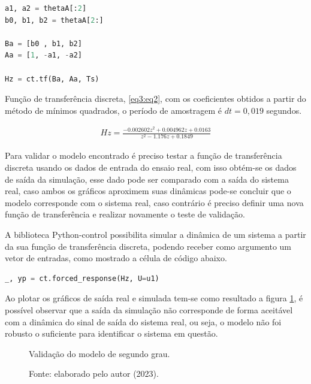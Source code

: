 \vspace{0.5cm}

\begin{lstlisting}[language=python]
a1, a2 = thetaA[:2]
b0, b1, b2 = thetaA[2:]

Ba = [b0 , b1, b2]
Aa = [1, -a1, -a2]

Hz = ct.tf(Ba, Aa, Ts)
\end{lstlisting}

Função de transferência discreta, \ref{eq3:eq2}, com os coeficientes obtidos a partir do método de mínimos quadrados, o período de amostragem é $dt = 0,019$  segundos.

\begin{align}
Hz = \frac{-0.002602 z^2 + 0.004962 z + 0.0163}{z^2 - 1.176 z + 0.1849} \label{eq3:eq2}
\end{align}


Para validar o modelo encontrado é preciso testar a função de transferência discreta usando os dados de entrada do ensaio real, com isso obtém-se os dados de saída da simulação, esse dado pode ser comparado com a saída do sistema real, caso ambos os gráficos aproximem suas dinâmicas pode-se concluir que o modelo corresponde com o sistema real, caso contrário é preciso definir uma nova função de transferência e realizar novamente o teste de validação.

A biblioteca Python-control possibilita simular a dinâmica de um sistema a partir da sua função de transferência discreta, podendo receber como argumento um vetor de entradas, como mostrado a célula de código abaixo.

\vspace{0.5cm}

\begin{lstlisting}[language=python]
_, yp = ct.forced_response(Hz, U=u1)
\end{lstlisting}

Ao plotar os gráficos de saída real e simulada tem-se como resultado a figura \ref{fig3:image_21}, é possível observar que a saída da simulação não corresponde de forma aceitável com a dinâmica do sinal de saída do sistema real, ou seja, o modelo não foi robusto o suficiente para identificar o sistema em questão.

\begin{figure}[!h]
	\centering
	\caption{Validação do modelo de segundo grau.}
	\caption*{Fonte: elaborado pelo autor (2023).}
	\label{fig3:image_21}
\end{figure}

